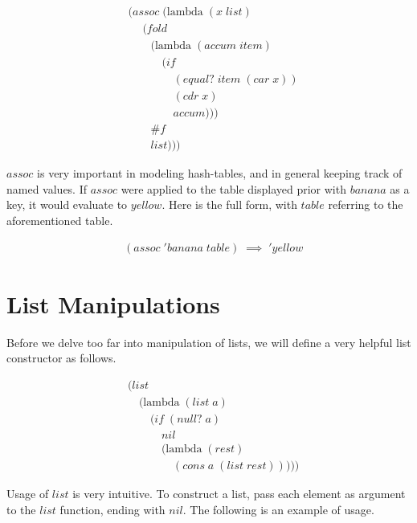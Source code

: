 \begin{figure}[ht]
\caption{}\label{scheme}
\begin{align*}
& (assoc \; (\text{lambda} \; (x \; list)
\\& \quad \; (fold \; 
\\& \qquad (\text{lambda} \; (accum \; item) \; 
\\& \qquad \quad (if \; 
\\& \qquad \qquad (equal? \; item \; (car \; x))
\\& \qquad \qquad (cdr \; x)
\\& \qquad \qquad accum)))
\\& \qquad \#f
\\& \qquad list)))
\end{align*}
\end{figure}

$assoc$ is very important in modeling hash-tables, and in general keeping track of 
named values. If $assoc$ were applied to the table displayed prior with $banana$ 
as a key, it would evaluate to $yellow$. Here is the full form, with $table$ 
referring to the aforementioned table.

\begin{figure}[ht]
\caption{}\label{scheme}
\begin{align*}
& (assoc \; 'banana \; table) \; \implies \; 'yellow
\end{align*}
\end{figure}

\section{List Manipulations}
Before we delve too far into manipulation of lists, we will define a very helpful 
list constructor as follows.

\begin{figure}[ht]
\caption{}\label{scheme}
\begin{align*}
& (list \; 
\\& \quad (\text{lambda} \; (list \; a) \; 
\\& \qquad (if \; (null? \; a)
\\& \qquad \quad nil
\\& \qquad \quad (\text{lambda} \; (rest)
\\& \qquad \qquad (cons \; a \; (list \; rest)))))
\end{align*}
\end{figure}

Usage of $list$ is very intuitive. To construct a list, pass each element as 
argument to the $list$ function, ending with $nil$. The following is an example of 
usage.   

